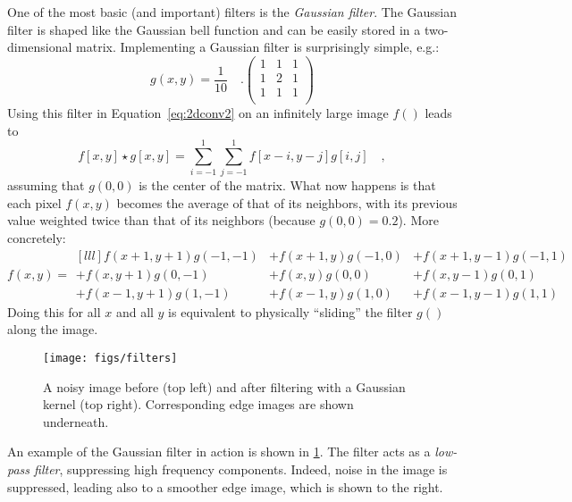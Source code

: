 One of the most basic (and important) filters is the \textsl{Gaussian filter}. The Gaussian filter is shaped like the Gaussian bell function and can be easily stored in a two-dimensional matrix. Implementing a Gaussian filter is surprisingly simple, e.g.:
\begin{equation}
g(x,y)=\frac{1}{10}\quad.
\left(
\begin{array}{ccc}
1 & 1 & 1\\
1 & 2 & 1\\
1 & 1 & 1\\
\end{array}
\right)
\end{equation}
Using this filter in Equation~\ref{eq:2dconv2} on an infinitely large image $f()$ leads to
\begin{equation}\label{eq:2dconv3}
f[x,y]\star g[x,y]=\sum_{i=-1}^{1}\sum_{j=-1}^{1}f[x-i,y-j]g[i,j]\quad,
\end{equation}
assuming that $g(0,0)$ is the center of the matrix. What now happens is that each pixel $f(x,y)$ becomes the average of that of its neighbors, with its previous value weighted twice than that of its neighbors (because $g(0,0)=0.2$). More concretely:
\begin{equation}
f(x,y)=
\begin{smallmatrix*}[lll]
f(x+1,y+1)g(-1,-1) &+f(x+1,y)g(-1,0) &+f(x+1,y-1)g(-1,1)\\
+f(x,y+1)g(0,-1) &+f(x,y)g(0,0) &+f(x,y-1)g(0,1)\\
+f(x-1,y+1)g(1,-1) &+f(x-1,y)g(1,0) &+f(x-1,y-1)g(1,1)
\end{smallmatrix*}
\end{equation}
Doing this for all $x$ and all $y$ is equivalent to physically ``sliding'' the filter $g()$ along the image.

\begin{figure}[!]
    \centering
    \texttt{[image: figs/filters]}
    \caption{A noisy image before (top left) and after filtering with a Gaussian kernel (top right). Corresponding edge images are shown underneath.
    \label{fig:filters}}
\end{figure}

An example of the Gaussian filter in action is shown in \cref{fig:filters}. The filter acts as a \textsl{low-pass filter}, suppressing high frequency components. Indeed, noise in the image is suppressed, leading also to a smoother edge image, which is shown to the right.

